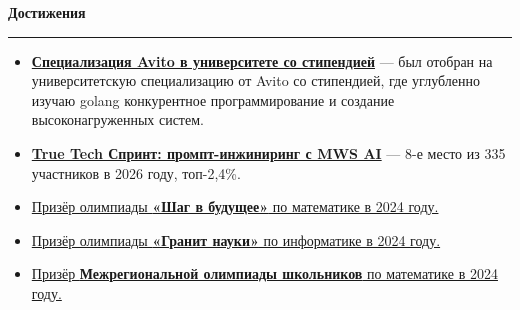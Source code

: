 \documentclass[10pt,a4paper]{article}
\newcommand{\resumesection}[1]{
  \vspace{3pt}
  {\large\bfseries\color{sectioncolor} #1}\par
  \vspace{1pt}
  \hrule
  \vspace{2pt}
}
\begin{document}
\resumesection{Достижения}
\begin{itemize}
	\item \href{https://start.avito.ru/tech-itmo}{\textbf{Специализация Avito в университете со стипендией}} --- был отобран на университетскую специализацию от Avito со стипендией, где углубленно изучаю golang конкурентное программирование и создание высоконагруженных систем.
	\item \href{https://truetecharena.ru/contests/true-tech-sprint-prompt-inzhiniring-s-mws-ai#leaderboard}{\textbf{True Tech Спринт: промпт-инжиниринг с MWS AI}} --- 8-е место из 335 участников в 2026 году, топ-2{,}4\%.
	\item \href{https://olymp.bmstu.ru/ru/winners/list/2024/11/maths}{Призёр олимпиады \textbf{«Шаг в будущее»} по математике в 2024 году.}
	\item \href{https://ogn.spmi.ru/rezultaty-zaklyuchitelnogo-tura-po-profilyu-informatika}{Призёр олимпиады \textbf{«Гранит науки»} по информатике в 2024 году.}
	\item \href{https://diploma.rsr-olymp.ru/files/rsosh-diplomas-static/compiled-storage-2024/by-code/363783216130/color.pdf}{Призёр \textbf{Межрегиональной олимпиады школьников} по математике в 2024 году.}
\end{itemize}
\end{document}
